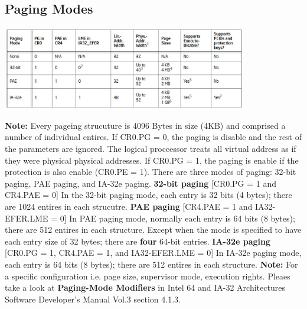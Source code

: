 \documentclass[letterpaper,10pt,titlepage,fleqn]{article}
\begin{document}
\subsection*{Paging Modes}
\begin{center}
   \includegraphics[width=0.8\textwidth]{paging_modes.eps}
\end{center}
\textbf{Note: }Every pageing strucuture is 4096 Bytes in size (4KB) and comprised a number of individual entires.
\newline
\newline
If CR0.PG = 0, the paging is disable and the rest of the parameters are ignored.  The logical proccessor treats all virtual address as if they were physical physical addresses. 
\newline
\newline
If CR0.PG = 1, the paging is enable if the protection is also enable (CR0.PE = 1). 
There are three modes of paging: 32-bit paging, PAE paging, and IA-32e paging. \newline
\newline
\textbf{32-bit paging} [CR0.PG = 1 and CR4.PAE = 0] \newline
In the 32-bit paging mode, each entry is 32 bits (4 bytes); there are 1024 entires in each strucutre. 
\newline
\newline
\textbf{PAE paging}    [CR4.PAE = 1 and IA32-EFER.LME = 0] \newline
In PAE paging mode, normally each entry is 64 bits (8 bytes); there are 512 entires in each structure.
Except when the mode is specified to have each entry size of 32 bytes; there are \textbf{four} 64-bit entries.
\newline
\newline
\textbf{IA-32e paging} [CR0.PG = 1, CR4.PAE = 1, and IA32-EFER.LME = 0] \newline
In IA-32e paging mode, each entry is 64 bits (8 bytes); there are 512 entires in each structure.
\newline
\newline
\textbf{Note: } For a specific configuration i.e. page size, supervisor mode, execution rights. Pleaes take a
look at \textbf{Paging-Mode Modifiers} in Intel 64 and IA-32 Architectures Software Developer's Manual Vol.3 
section 4.1.3.
\end{document}
